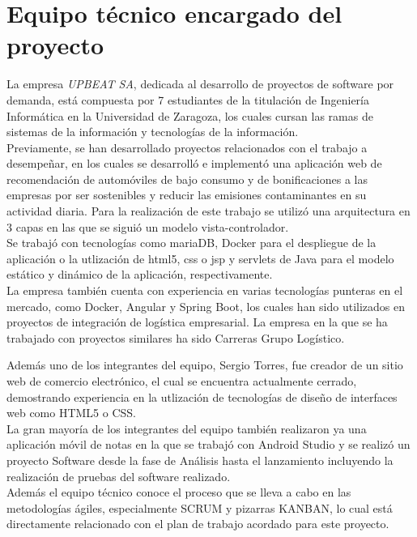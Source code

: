 \documentclass{article}
\begin{document}
\section{Equipo técnico encargado del proyecto}
La empresa \textit{UPBEAT SA}, dedicada al desarrollo de proyectos de software por demanda, está compuesta por 7 estudiantes de la titulación de Ingeniería Informática en la Universidad de Zaragoza, los cuales cursan las ramas de sistemas de la información y tecnologías de la información.
\hfill \break
\\
Previamente, se han desarrollado proyectos relacionados con el trabajo a desempeñar, en los cuales se desarrolló e implementó una aplicación web de recomendación de automóviles de bajo consumo y de bonificaciones a las empresas por ser sostenibles y reducir las emisiones contaminantes en su actividad diaria. Para la realización de este trabajo se utilizó una arquitectura en 3 capas en las que se siguió un modelo vista-controlador.\\ Se trabajó con tecnologías como mariaDB, Docker para el despliegue de la aplicación o la utlización de html5, css o jsp y servlets de Java para el modelo estático y dinámico de la aplicación, respectivamente.
\hfill \break
\\
La empresa también cuenta con experiencia en varias tecnologías punteras en el mercado, como Docker, Angular y Spring Boot, los cuales han sido utilizados en proyectos de integración de logística empresarial.
La empresa en la que se ha trabajado con proyectos similares ha sido Carreras Grupo Logístico.
\hfill \break

Además uno de los integrantes del equipo, Sergio Torres, fue creador de un sitio web de comercio electrónico, el cual se encuentra actualmente cerrado, demostrando experiencia en la utlización de tecnologías de diseño de interfaces web como HTML5 o CSS.\\

La gran mayoría de los integrantes del equipo también realizaron ya una aplicación móvil de notas en la que se trabajó con Android Studio y se realizó un proyecto Software desde la fase de Análisis hasta el lanzamiento incluyendo la realización de pruebas del software realizado.\\

Además el equipo técnico conoce el proceso que se lleva a cabo en las metodologías ágiles, especialmente SCRUM y pizarras KANBAN, lo cual está directamente relacionado con el plan de trabajo acordado para este proyecto.
\newpage
\end{document}
